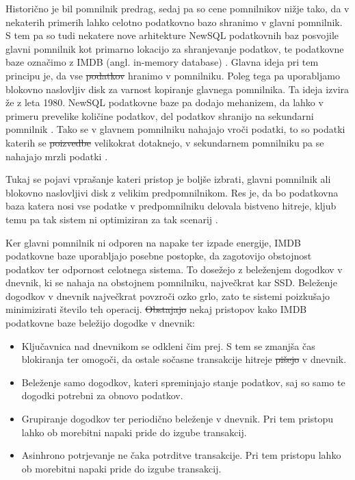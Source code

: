 \documentclass[a4paper, 12pt]{book}
\providecommand{\DIFaddtex}[1]{{\protect\color{blue}\uwave{#1}}} %
\providecommand{\DIFdeltex}[1]{{\protect\color{red}\sout{#1}}}                      %
\providecommand{\DIFaddbegin}{} %
\providecommand{\DIFaddend}{} %
\providecommand{\DIFdelbegin}{} %
\providecommand{\DIFdelend}{} %
\providecommand{\DIFadd}[1]{\texorpdfstring{\DIFaddtex{#1}}{#1}} %
\providecommand{\DIFdel}[1]{\texorpdfstring{\DIFdeltex{#1}}{}} %
\newcommand{\DIFscaledelfig}{0.5}
\newlength{\DIFdelgraphicswidth} %
\newlength{\DIFdelgraphicsheight} %
\newcommand{\DIFaddincludegraphics}[2][]{{\color{blue}\fbox{\DIFOincludegraphics[#1]{#2}}}} %
\newcommand{\DIFdelincludegraphics}[2][]{%
\sbox{\DIFdelgraphicsbox}{\DIFOincludegraphics[#1]{#2}}%
\settoboxwidth{\DIFdelgraphicswidth}{\DIFdelgraphicsbox} %
\settoboxtotalheight{\DIFdelgraphicsheight}{\DIFdelgraphicsbox} %
\scalebox{\DIFscaledelfig}{%
\parbox[b]{\DIFdelgraphicswidth}{\usebox{\DIFdelgraphicsbox}\\[-\baselineskip] \rule{\DIFdelgraphicswidth}{0em}}\llap{\resizebox{\DIFdelgraphicswidth}{\DIFdelgraphicsheight}{%
\setlength{\unitlength}{\DIFdelgraphicswidth}%
\begin{picture}(1,1)%
\thicklines\linethickness{2pt} %
{\color[rgb]{1,0,0}\put(0,0){\framebox(1,1){}}}%
{\color[rgb]{1,0,0}\put(0,0){\line( 1,1){1}}}%
{\color[rgb]{1,0,0}\put(0,1){\line(1,-1){1}}}%
\end{picture}%
}\hspace*{3pt}}} %
} %
\DeclareRobustCommand{\DIFaddbegin}{\DIFOaddbegin \let\includegraphics\DIFaddincludegraphics} %
\DeclareRobustCommand{\DIFaddend}{\DIFOaddend \let\includegraphics\DIFOincludegraphics} %
\DeclareRobustCommand{\DIFdelbegin}{\DIFOdelbegin \let\includegraphics\DIFdelincludegraphics} %
\DeclareRobustCommand{\DIFdelend}{\DIFOaddend \let\includegraphics\DIFOincludegraphics} %
\begin{document}
Historično je bil pomnilnik predrag, sedaj pa so cene pomnilnikov nižje tako, da v nekaterih primerih lahko celotno podatkovno bazo shranimo v glavni pomnilnik. S tem pa so tudi nekatere nove arhitekture NewSQL podatkovnih baz posvojile glavni pomnilnik kot primarno lokacijo za shranjevanje podatkov, te podatkovne baze označimo z IMDB (angl. in-memory database) \cite{NewSqlInMemoryAnalytics}. Glavna ideja pri tem principu je, da vse \DIFdelbegin \DIFdel{podatkov }\DIFdelend \DIFaddbegin \DIFadd{podatke }\DIFaddend hranimo v pomnilniku. Poleg tega pa uporabljamo blokovno naslovljiv disk za varnost kopiranje glavnega pomnilnika. Ta ideja izvira že z leta 1980.
NewSQL podatkovne baze pa dodajo mehanizem, da lahko v primeru prevelike količine podatkov, del podatkov shranijo na sekundarni pomnilnik \cite{Pavlo2016Sep}. Tako se v glavnem pomnilniku nahajajo vroči podatki, to so podatki katerih se \DIFdelbegin \DIFdel{poizvedbe }\DIFdelend \DIFaddbegin \DIFadd{po\-iz\-ved\-be }\DIFaddend velikokrat dotaknejo, v sekundarnem pomnilniku pa se nahajajo mrzli podatki \cite{NewSqlInMemoryAnalytics}.

Tukaj se pojavi vprašanje kateri pristop je boljše izbrati, glavni pomnilnik ali blokovno naslovljivi disk z velikim predpomnilnikom. Res je, da bo podatkovna baza katera nosi vse podatke v predpomnilniku delovala bistveno hitreje, kljub temu pa tak sistem ni optimiziran za tak scenarij \cite{garcia1992main}.

Ker glavni pomnilnik ni odporen na napake ter izpade energije, IMDB podatkovne baze uporabljajo posebne postopke, da zagotovijo obstojnost podatkov ter odpornost celotnega sistema. To dosežejo z beleženjem dogodkov v dnevnik, ki se nahaja na obstojnem pomnilniku, največkrat kar SSD. Beleženje dogodkov v dnevnik največkrat povzroči ozko grlo, zato te sistemi poizkušajo minimizirati število \cite{MainMemoryDatabaseSystems} teh operacij. \DIFdelbegin \DIFdel{Obstajajo }\DIFdelend \DIFaddbegin \DIFadd{Obstaja }\DIFaddend nekaj pristopov kako IMDB podatkovne baze beležijo dogodke v dnevnik:

\begin{itemize}
    \item Ključavnica nad dnevnikom se odkleni čim prej. S tem se zmanjša čas blokiranja ter omogoči, da \DIFaddbegin \DIFadd{se }\DIFaddend ostale sočasne transakcije hitreje \DIFdelbegin \DIFdel{pišejo }\DIFdelend \DIFaddbegin \DIFadd{zapišejo }\DIFaddend v dnevnik. \cite{NewSqlInMemoryAnalytics}
    \item Beleženje samo dogodkov, kateri spreminjajo stanje podatkov, saj so samo te dogodki potrebni za obnovo podatkov. \cite{MainMemoryDatabaseSystems}
    \item Grupiranje dogodkov ter periodično beleženje v dnevnik. Pri tem pristopu lahko ob morebitni napaki pride do izgube transakcij. \cite{NewSqlInMemoryAnalytics}
    \item Asinhrono potrjevanje ne čaka potrditve transakcije. Pri tem pristopu lahko ob morebitni napaki pride do izgube transakcij. \cite{NewSqlInMemoryAnalytics}
\end{itemize}
\end{document}
